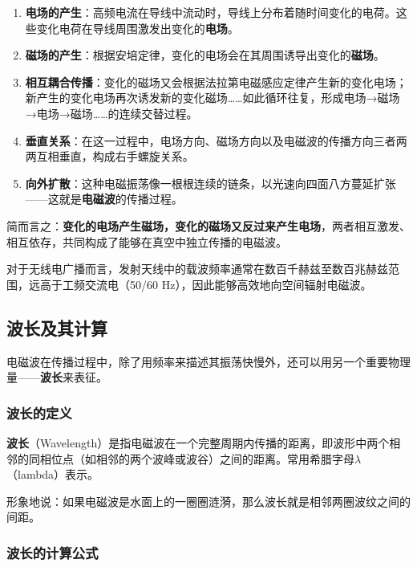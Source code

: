 \documentclass[12pt,UTF8]{ctexbook}
\begin{document}
\begin{enumerate}
	\item \textbf{电场的产生}：高频电流在导线中流动时，导线上分布着随时间变化的电荷。这些变化电荷在导线周围激发出变化的\textbf{电场}。
	
	\item \textbf{磁场的产生}：根据安培定律，变化的电场会在其周围诱导出变化的\textbf{磁场}。
	
	\item \textbf{相互耦合传播}：变化的磁场又会根据法拉第电磁感应定律产生新的变化电场；新产生的变化电场再次诱发新的变化磁场……如此循环往复，形成电场→磁场→电场→磁场……的连续交替过程。
	
	\item \textbf{垂直关系}：在这一过程中，电场方向、磁场方向以及电磁波的传播方向三者两两互相垂直，构成右手螺旋关系。
	
	\item \textbf{向外扩散}：这种电磁振荡像一根根连续的链条，以光速向四面八方蔓延扩张——这就是\textbf{电磁波}的传播过程。
\end{enumerate}

简而言之：\textbf{变化的电场产生磁场，变化的磁场又反过来产生电场}，两者相互激发、相互依存，共同构成了能够在真空中独立传播的电磁波。

对于无线电广播而言，发射天线中的载波频率通常在数百千赫兹至数百兆赫兹范围，远高于工频交流电（50/60 Hz），因此能够高效地向空间辐射电磁波。

\subsection{波长及其计算}

电磁波在传播过程中，除了用频率来描述其振荡快慢外，还可以用另一个重要物理量——\textbf{波长}来表征。

\subsubsection{波长的定义}

\textbf{波长}（Wavelength）是指电磁波在一个完整周期内传播的距离，即波形中两个相邻的同相位点（如相邻的两个波峰或波谷）之间的距离。常用希腊字母$\lambda$（lambda）表示。

形象地说：如果电磁波是水面上的一圈圈涟漪，那么波长就是相邻两圈波纹之间的间距。\subsubsection{波长的计算公式}
\end{document}
